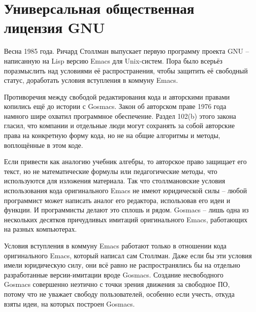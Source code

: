 

\chapter{Универсальная общественная лицензия GNU}

Весна 1985 года. Ричард Столлман выпускает первую программу проекта GNU -- написанную на Lisp версию Emacs для Unix-систем. Пора было всерьёз поразмыслить над условиями её распространения, чтобы защитить её свободный статус, доработать условия вступления в коммуну Emacs.

Противоречия между свободой редактирования кода и авторскими правами копились ещё до истории с Gosmacs. Закон об авторском праве 1976 года намного шире охватил программное обеспечение. Раздел 102(b) этого закона гласил, что компании и отдельные люди могут сохранять за собой авторские права на конкретную форму кода, но не на общие алгоритмы и методы, воплощённые в этом коде. 

Если привести как аналогию учебник алгебры, то авторское право защищает его текст, но не математические формулы или педагогические методы, что используются для изложения материала. Так что столлмановские условия использования кода оригинального Emacs не имеют юридической силы -- любой программист может написать аналог его редактора, использовав его идеи и функции. И программисты делают это сплошь и рядом. Gosmacs -- лишь одна из нескольких десятков причудливых имитаций оригинального Emacs, работающих на разных компьютерах.

Условия вступления в коммуну Emacs работают только в отношении кода оригинального Emacs, который написал сам Столлман. Даже если бы эти условия имели юридическую силу, они всё равно не распространялись бы на отдельно разработанные версии-имитации вроде Gosmacs. Создание несвободного Gosmacs совершенно неэтично с точки зрения движения за свободное ПО, потому что не уважает свободу пользователей, особенно если учесть, откуда взяты идеи, на которых построен Gosmacs.

